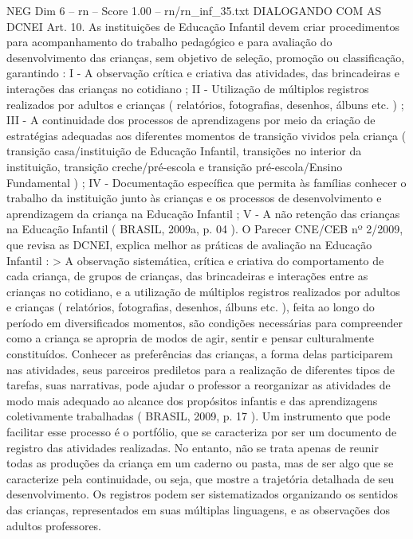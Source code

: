 \begin{textsample}{NEG Dim 6 – rn – Score 1.00 – rn/rn\_inf\_35.txt}  \label{ex:f6_neg_060}
DIALOGANDO COM AS DCNEI Art. 10.
As instituições de Educação Infantil devem criar procedimentos para acompanhamento do trabalho pedagógico e para avaliação do desenvolvimento das crianças, sem objetivo de seleção, promoção ou classificação, garantindo : I - A observação crítica e criativa das atividades, das brincadeiras e interações das crianças no cotidiano ; II - Utilização de múltiplos registros realizados por adultos e crianças ( relatórios, fotografias, desenhos, álbuns etc. ) ; III - A continuidade dos processos de aprendizagens por meio da criação de estratégias adequadas aos diferentes momentos de transição vividos pela criança ( transição casa/instituição de Educação Infantil, transições no interior da instituição, transição creche/pré-escola e transição pré-escola/Ensino Fundamental ) ; IV - Documentação específica que permita às famílias conhecer o trabalho da instituição junto às crianças e os processos de desenvolvimento e aprendizagem da criança na Educação Infantil ; V - A não retenção das crianças na Educação Infantil ( BRASIL, 2009a, p. 04 ).
O Parecer CNE/CEB nº 2/2009, que revisa as DCNEI, explica melhor as práticas de avaliação na Educação Infantil : > A observação sistemática, crítica e criativa do comportamento de cada criança, de grupos de crianças, das brincadeiras e interações entre as crianças no cotidiano, e a utilização de múltiplos registros realizados por adultos e crianças ( relatórios, fotografias, desenhos, álbuns etc. ), feita ao longo do período em diversificados momentos, são condições necessárias para compreender como a criança se apropria de modos de agir, sentir e pensar culturalmente constituídos.
Conhecer as preferências das crianças, a forma delas participarem nas atividades, seus parceiros prediletos para a realização de diferentes tipos de tarefas, suas narrativas, pode ajudar o professor a reorganizar as atividades de modo mais adequado ao alcance dos propósitos infantis e das aprendizagens coletivamente trabalhadas ( BRASIL, 2009, p. 17 ).
Um instrumento que pode facilitar esse processo é o portfólio, que se caracteriza por ser um documento de registro das atividades realizadas.
No entanto, não se trata apenas de reunir todas as produções da criança em um caderno ou pasta, mas de ser algo que se caracterize pela continuidade, ou seja, que mostre a trajetória detalhada de seu desenvolvimento.
Os registros podem ser sistematizados organizando os sentidos das crianças, representados em suas múltiplas linguagens, e as observações dos adultos professores.

\end{textsample}
